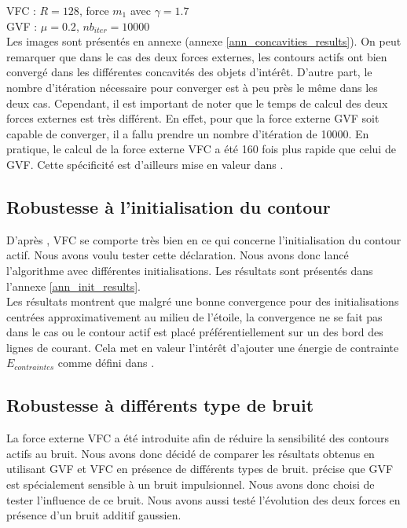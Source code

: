 VFC : $R = 128$, force $m_{1}$ avec $\gamma = 1.7$\\
GVF : $\mu = 0.2$, $nb_{iter} = 10000$\\

Les images sont présentés en annexe (annexe  \ref{ann_concavities_results}). On peut remarquer que dans le cas des deux forces externes, les contours actifs ont bien convergé dans les différentes concavités des objets d'intérêt. D'autre part, le nombre d'itération nécessaire pour converger est à peu près le même dans les deux cas. Cependant, il est important de noter que le temps de calcul des deux forces externes est très différent. En effet, pour que la force externe GVF soit capable de converger, il a fallu prendre un nombre d'itération de 10000. En pratique, le calcul de la force externe VFC a été 160 fois plus rapide que celui de GVF. Cette spécificité est d'ailleurs mise en valeur dans \cite{vfc}. 

\subsection{Robustesse à l'initialisation du contour}
D'après \cite{vfc}, VFC se comporte très bien en ce qui concerne l'initialisation du contour actif. Nous avons voulu tester cette déclaration. Nous avons donc lancé l'algorithme avec différentes initialisations. Les résultats sont présentés dans l'annexe \ref{ann_init_results}.\\ 

Les résultats montrent que malgré une bonne convergence pour des initialisations centrées approximativement au milieu de l'étoile, la convergence ne se fait pas dans le cas ou le contour actif est placé préférentiellement sur un des bord des lignes de courant. Cela met en valeur l'intérêt d'ajouter une énergie de contrainte $E_{contraintes}$ comme défini dans \cite{kaas}. 


\subsection{Robustesse à différents type de bruit}
\label{subsec:noise}
La force externe VFC a été introduite afin de réduire la sensibilité des contours actifs au bruit. Nous avons donc décidé de comparer les résultats obtenus en utilisant GVF et VFC en présence de différents types de bruit. \cite{vfc} précise que GVF est spécialement sensible à un bruit impulsionnel. Nous avons donc choisi de tester l'influence de ce bruit. Nous avons aussi testé l'évolution des deux forces en présence d'un bruit additif gaussien. 

